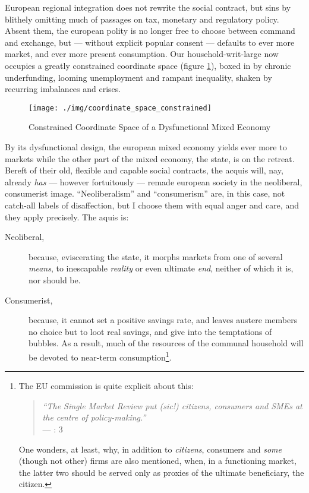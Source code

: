 \documentclass[11pt,a4paper,oneside,openright]{article}
\begin{document}
European regional integration does not rewrite the social contract, but sins by blithely omitting much of passages on tax, monetary and regulatory policy. 
Absent them, the european polity is no longer free to choose between %
command and exchange, but --- without explicit popular consent --- defaults to ever more market, and ever more present consumption. 
Our household-writ-large now occupies a greatly constrained coordinate space (figure \ref{fig:coordinate_space_constrained}), boxed in by chronic underfunding,  looming unemployment and rampant inequality, shaken by recurring imbalances and crises. 

\begin{figure}[htbp]
	\begin{center}
	\texttt{[image: ./img/coordinate\_space\_constrained]}  
	\caption{Constrained Coordinate Space of a Dysfunctional Mixed Economy}
	\label{fig:coordinate_space_constrained}
	\end{center}
\end{figure}

By its dysfunctional design, the european mixed economy yields ever more to markets while the other part of the mixed economy, the state, is on the retreat. 
Bereft of their old, flexible and capable social contracts, the acquis will, nay, already \emph{has} --- however fortuitously --- remade european society in the neoliberal, consumerist image. 
``Neoliberalism'' and ``consumerism'' are, in this case, not catch-all labels of disaffection, but I choose them with equal anger and care, and they apply precisely. 
The aquis is:
\begin{description}
	\item[Neoliberal,] because, eviscerating the state, it morphs markets from one of several \emph{means}, to inescapable \emph{reality} or even ultimate \emph{end}, neither of which it is, nor should be.
	\item[Consumerist,] because, it cannot set a positive savings rate, and leaves austere members no choice but to loot real savings, and give into the temptations of bubbles. 
	As a result, much of the resources of the communal household will be devoted to near-term consumption\footnote{
		The \gls{EU} commission is quite explicit about this:
			\begin{quote}
				\emph{``The Single Market Review put \emph{(sic!)} citizens, consumers and \glspl{SME} at the centre of policy-making.''}\\
				--- \citealt{Commission2008}: 3	 
			\end{quote} 
		One wonders, at least, why, in addition to \emph{citizens}, consumers and \emph{some} (though not other) firms are also mentioned, when, in a functioning market, the latter two should be served only as proxies of the ultimate beneficiary, the citizen.}.
	
\end{description}
\end{document}
